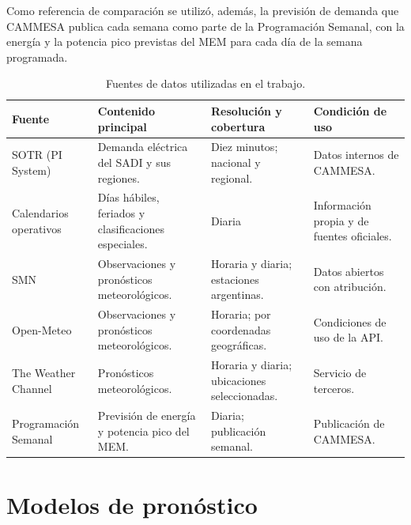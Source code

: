 Como referencia de comparación se utilizó, además, la previsión de demanda que CAMMESA publica cada semana como parte de la Programación Semanal, con la energía y la potencia pico previstas del MEM para cada día de la semana programada.

\begin{table}[H]
	\centering
	\caption{Fuentes de datos utilizadas en el trabajo.}
	\label{tab:fuentes_datos}
	\footnotesize
	\setlength{\tabcolsep}{4pt}
	\renewcommand{\arraystretch}{1.15}
	\begin{tabularx}{\textwidth}{
			@{}
			>{\raggedright\arraybackslash\hsize=0.8\hsize}X
			>{\raggedright\arraybackslash\hsize=1.1\hsize}X
			>{\raggedright\arraybackslash\hsize=1.1\hsize}X
			>{\raggedright\arraybackslash\hsize=1.0\hsize}X
			@{}
		}
		\toprule
		\textbf{Fuente} & \textbf{Contenido principal} & \textbf{Resolución y cobertura} & \textbf{Condición de uso} \\
		\midrule
		SOTR (PI System) & Demanda eléctrica del SADI y sus regiones. & Diez minutos; nacional y regional. & Datos internos de CAMMESA. \\
		Calendarios operativos & Días hábiles, feriados y clasificaciones especiales. & Diaria & Información propia y de fuentes oficiales. \\
		SMN & Observaciones y pronósticos meteorológicos. & Horaria y diaria; estaciones argentinas. & Datos abiertos con atribución. \\
		Open-Meteo & Observaciones y pronósticos meteorológicos. & Horaria; por coordenadas geográficas. & Condiciones de uso de la API. \\
		The Weather Channel & Pronósticos meteorológicos. & Horaria y diaria; ubicaciones seleccionadas. & Servicio de terceros. \\
		Programación Semanal & Previsión de energía y potencia pico del MEM. & Diaria; publicación semanal. & Publicación de CAMMESA. \\
		\bottomrule
	\end{tabularx}
\end{table}

\section{Modelos de pronóstico}
\label{sec:modelos_pronostico}

